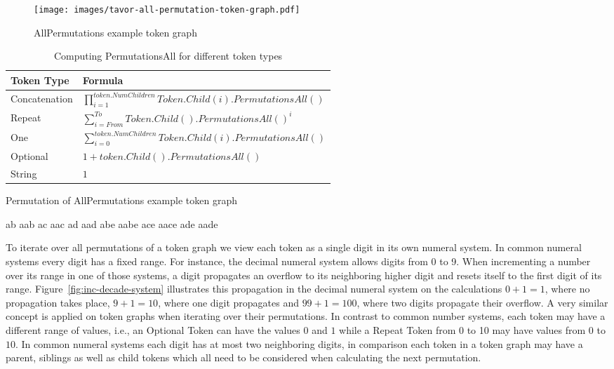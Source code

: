 \begin{figure}
\texttt{[image: images/tavor-all-permutation-token-graph.pdf]}
\caption{AllPermutations example token graph}
\label{fig:all-perm-token-graph}
\end{figure}

\begin{table}[bt]
\caption{Computing PermutationsAll for different token types}
\label{table:compute-All-perms}
\center
\begin{tabular}{| l | l |}
\hline
  \textbf{Token Type}
& \textbf{Formula}
\tabularnewline
\hline
  Concatenation
& $\prod_{i=1}^{token.NumChildren} Token.Child(i).PermutationsAll()$
\tabularnewline
\hline
  Repeat
& $\sum_{i=From}^{To} Token.Child().PermutationsAll()^i$
\tabularnewline
\hline
  One
& $\sum_{i=0}^{token.NumChildren} Token.Child(i).PermutationsAll()$
\tabularnewline
\hline
  Optional
& $1 + token.Child().PermutationsAll()$
\tabularnewline
\hline
  String
& $1$
\tabularnewline
\hline
\end{tabular}
\end{table}

\begin{listing}
\caption{Permutation of AllPermutations example token graph}
\label{lst:permutations-allperm-token-graph}
\begin{gocode}
ab
aab
ac
aac
ad
aad
abe
aabe
ace
aace
ade
aade
\end{gocode}
\end{listing}

To iterate over all permutations of a token graph we view each token as a single digit in its own numeral system. In common numeral systems every digit has a fixed range. For instance, the decimal numeral system allows digits from 0 to 9. When incrementing a number over its range in one of those systems, a digit propagates an overflow to its neighboring higher digit and resets itself to the first digit of its range. Figure~\ref{fig:inc-decade-system} illustrates this propagation in the decimal numeral system on the calculations $0+1=1$, where no propagation takes place, $9+1=10$, where one digit propagates and $99+1=100$, where two digits propagate their overflow. A very similar concept is applied on token graphs when iterating over their permutations. In contrast to common number systems, each token may have a different range of values, i.e., an Optional Token can have the values $0$ and $1$ while a Repeat Token from 0 to 10 may have values from $0$ to $10$. In common numeral systems each digit has at most two neighboring digits, in comparison each token in a token graph may have a parent, siblings as well as child tokens which all need to be considered when calculating the next permutation.

